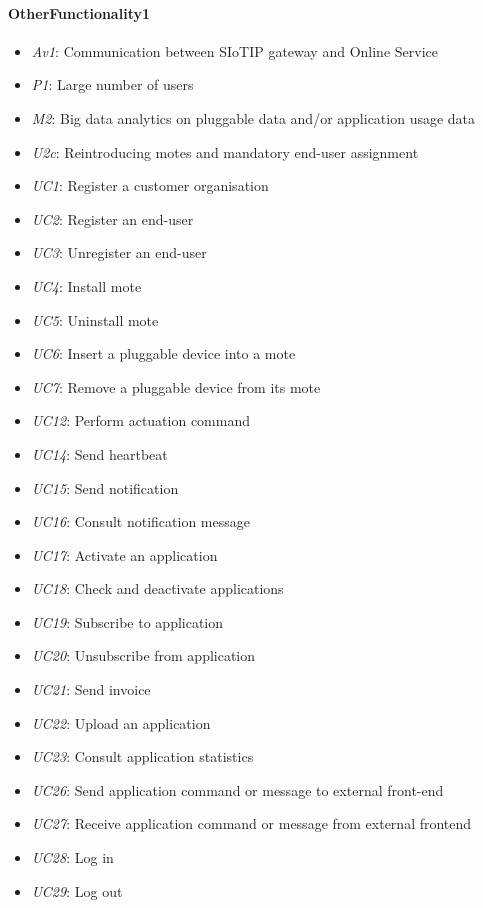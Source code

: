 \documentclass[english]{sareport}
\begin{document}
\paragraph{OtherFunctionality1}
\begin{itemize}
	\item \emph{Av1}: Communication between SIoTIP gateway and Online Service
	\item \emph{P1}: Large number of users
	\item \emph{M2}: Big data analytics on pluggable data and/or application usage data
	\item \emph{U2c}: Reintroducing motes and mandatory end-user assignment
	\item \emph{UC1}: Register a customer organisation
	\item \emph{UC2}: Register an end-user
	\item \emph{UC3}: Unregister an end-user
	\item \emph{UC4}: Install mote
	\item \emph{UC5}: Uninstall mote
	\item \emph{UC6}: Insert a pluggable device into a mote
	\item \emph{UC7}: Remove a pluggable device from its mote
	\item \emph{UC12}: Perform actuation command
	\item \emph{UC14}: Send heartbeat
	\item \emph{UC15}: Send notification
	\item \emph{UC16}: Consult notification message
	\item \emph{UC17}: Activate an application
	\item \emph{UC18}: Check and deactivate applications
	\item \emph{UC19}: Subscribe to application
	\item \emph{UC20}: Unsubscribe from application
	\item \emph{UC21}: Send invoice
	\item \emph{UC22}: Upload an application
	\item \emph{UC23}: Consult application statistics
	\item \emph{UC26}: Send application command or message to external front-end
	\item \emph{UC27}: Receive application command or message from external frontend
	\item \emph{UC28}: Log in
	\item \emph{UC29}: Log out
\end{itemize}
\end{document}
